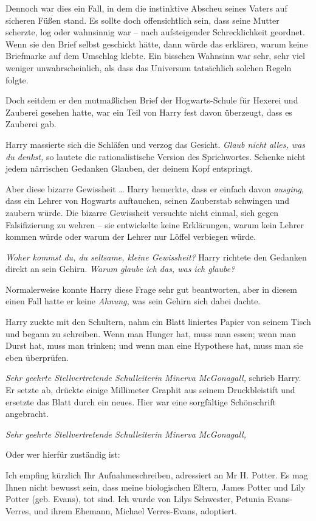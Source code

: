 {Dennoch war dies ein Fall, in dem die instinktive Abscheu seines Vaters auf sicheren Füßen stand. Es sollte doch offensichtlich sein, dass seine Mutter scherzte, log oder wahnsinnig war -- nach aufsteigender Schrecklichkeit geordnet. Wenn sie den Brief selbst geschickt hätte, dann würde das erklären, warum keine Briefmarke auf dem Umschlag klebte. Ein bisschen Wahnsinn war sehr, sehr viel weniger unwahrscheinlich, als dass das Universum tatsächlich solchen Regeln folgte.

Doch seitdem er den mutmaßlichen Brief der Hogwarts-Schule für Hexerei und Zauberei gesehen hatte, war ein Teil von Harry fest davon überzeugt, dass es Zauberei gab.

Harry massierte sich die Schläfen und verzog das Gesicht. \emph{Glaub nicht alles, was du denkst,} so lautete die rationalistische Version des Sprichwortes. Schenke nicht jedem närrischen Gedanken Glauben, der deinem Kopf entspringt.

Aber diese bizarre Gewissheit … Harry bemerkte, dass er einfach davon \emph{ausging,} dass ein Lehrer von Hogwarts auftauchen, seinen Zauberstab schwingen und zaubern würde. Die bizarre Gewissheit versuchte nicht einmal, sich gegen Falsifizierung zu wehren -- sie entwickelte keine Erklärungen, warum kein Lehrer kommen würde oder warum der Lehrer nur Löffel verbiegen würde.

\emph{Woher kommst du, du seltsame, kleine Gewissheit?} Harry richtete den Gedanken direkt an sein Gehirn. \emph{Warum glaube ich das, was ich glaube?}

Normalerweise konnte Harry diese Frage sehr gut beantworten, aber in diesem einen Fall hatte er keine \emph{Ahnung,} was sein Gehirn sich dabei dachte.

Harry zuckte mit den Schultern, nahm ein Blatt liniertes Papier von seinem Tisch und begann zu schreiben. Wenn man Hunger hat, muss man essen; wenn man Durst hat, muss man trinken; und wenn man eine Hypothese hat, muss man sie eben überprüfen.

\emph{Sehr geehrte Stellvertretende Schulleiterin Minerva McGonagall,} schrieb Harry. Er setzte ab, drückte einige Millimeter Graphit aus seinem Druckbleistift und ersetzte das Blatt durch ein neues. Hier war eine sorgfältige Schönschrift angebracht.

\emph{Sehr geehrte Stellvertretende Schulleiterin Minerva McGonagall,}

Oder wer hierfür zuständig ist:

Ich empfing kürzlich Ihr Aufnahmeschreiben, adressiert an Mr H. Potter. Es mag Ihnen nicht bewusst sein, dass meine biologischen Eltern, James Potter und Lily Potter (geb. Evans), tot sind. Ich wurde von Lilys Schwester, Petunia Evans-Verres, und ihrem Ehemann, Michael Verres-Evans, adoptiert.

}
